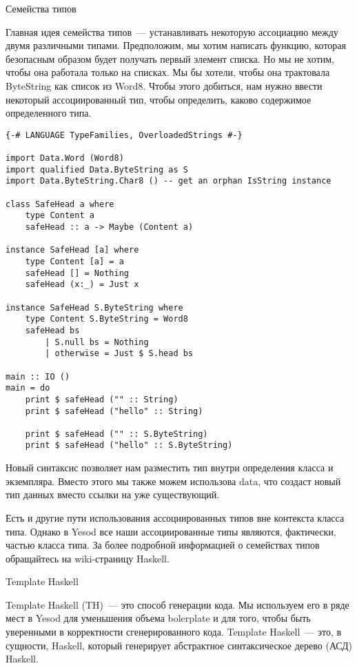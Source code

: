 Семейства типов

Главная идея семейства типов~--- устанавливать некоторую ассоциацию между двумя различными типами. Предположим, мы хотим написать функцию, которая безопасным образом будет получать первый элемент списка. Но мы не хотим, чтобы она работала только на списках. Мы бы хотели, чтобы она трактовала ByteString как список из Word8. Чтобы этого добиться, нам нужно ввести некоторый ассоциированный тип, чтобы определить, каково содержимое определенного типа.

\begin{verbatim}
{-# LANGUAGE TypeFamilies, OverloadedStrings #-}

import Data.Word (Word8)
import qualified Data.ByteString as S
import Data.ByteString.Char8 () -- get an orphan IsString instance

class SafeHead a where
    type Content a
    safeHead :: a -> Maybe (Content a)

instance SafeHead [a] where
    type Content [a] = a
    safeHead [] = Nothing
    safeHead (x:_) = Just x

instance SafeHead S.ByteString where
    type Content S.ByteString = Word8
    safeHead bs
        | S.null bs = Nothing
        | otherwise = Just $ S.head bs

main :: IO ()
main = do
    print $ safeHead ("" :: String)
    print $ safeHead ("hello" :: String)

    print $ safeHead ("" :: S.ByteString)
    print $ safeHead ("hello" :: S.ByteString)
\end{verbatim}

Новый синтаксис позволяет нам разместить тип внутри определения класса и экземпляра. Вместо этого мы также можем использова data, что создаст новый тип данных вместо ссылки на уже существующий.

Есть и другие пути использования ассоциированных типов вне контекста класса типа. Однако в Yesod все наши ассоциированные типы являются, фактически, частью класса типа. За более подробной информацией о семействах типов обращайтесь на wiki-страницу Haskell.

Template Haskell

Template Haskell (TH)~--- это способ генерации кода. Мы используем его в ряде мест в Yesod для уменьшения объема bolerplate и для того, чтобы быть уверенными в корректности сгенерированного кода. Template Haskell~--- это, в сущности, Haskell, который генерирует абстрактное синтаксическое дерево (АСД) Haskell.

